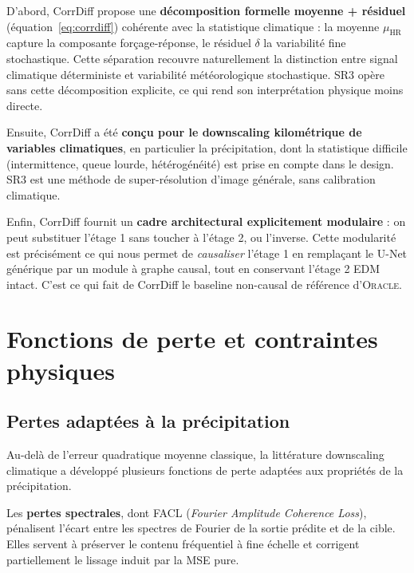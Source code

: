 \documentclass[14pt,a4paper,openany]{extreport}
\theoremstyle{definition}
\newcommand{\Oracle}{\textsc{Oracle}}
\newcommand{\HR}{\ensuremath{\text{HR}}}
\newcommand{\muHR}{\ensuremath{\mu_{\HR}}}
\begin{document}
D'abord, CorrDiff propose une \textbf{décomposition formelle moyenne + résiduel} (équation~\ref{eq:corrdiff}) cohérente avec la statistique climatique : la moyenne $\muHR$ capture la composante forçage-réponse, le résiduel $\delta$ la variabilité fine stochastique. Cette séparation recouvre naturellement la distinction entre signal climatique déterministe et variabilité météorologique stochastique. SR3 opère sans cette décomposition explicite, ce qui rend son interprétation physique moins directe.

Ensuite, CorrDiff a été \textbf{conçu pour le downscaling kilométrique de variables climatiques}, en particulier la précipitation, dont la statistique difficile (intermittence, queue lourde, hétérogénéité) est prise en compte dans le design. SR3 est une méthode de super-résolution d'image générale, sans calibration climatique.

Enfin, CorrDiff fournit un \textbf{cadre architectural explicitement modulaire} : on peut substituer l'étage 1 sans toucher à l'étage 2, ou l'inverse. Cette modularité est précisément ce qui nous permet de \emph{causaliser} l'étage 1 en remplaçant le U-Net générique par un module à graphe causal, tout en conservant l'étage 2 EDM intact. C'est ce qui fait de CorrDiff le baseline non-causal de référence d'\Oracle{}.

\section{Fonctions de perte et contraintes physiques}
\label{sec:soa-pertes}

\subsection{Pertes adaptées à la précipitation}
\label{ssec:soa-pertes-precip}

Au-delà de l'erreur quadratique moyenne classique, la littérature downscaling climatique a développé plusieurs fonctions de perte adaptées aux propriétés de la précipitation.

Les \textbf{pertes spectrales}, dont FACL (\emph{Fourier Amplitude Coherence Loss}), pénalisent l'écart entre les spectres de Fourier de la sortie prédite et de la cible. Elles servent à préserver le contenu fréquentiel à fine échelle et corrigent partiellement le lissage induit par la MSE pure.
\end{document}
